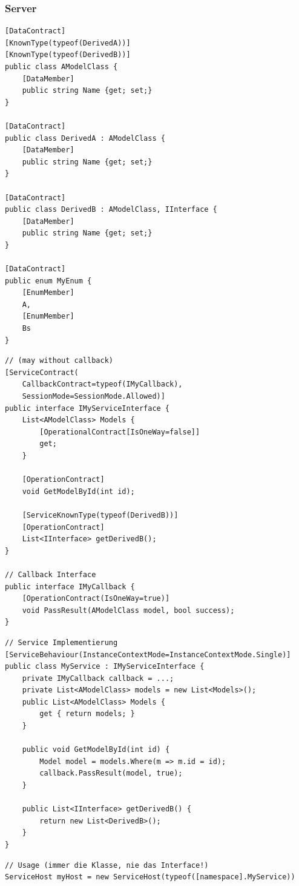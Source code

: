 \subsubsection{Server}
\begin{lstlisting}[caption=Data Transfer Objects (DTO)]
[DataContract]
[KnownType(typeof(DerivedA))]
[KnownType(typeof(DerivedB))]
public class AModelClass {
	[DataMember]
	public string Name {get; set;}	
}

[DataContract]
public class DerivedA : AModelClass {
	[DataMember]
	public string Name {get; set;}
}

[DataContract]
public class DerivedB : AModelClass, IInterface {
	[DataMember]
	public string Name {get; set;}
}

[DataContract]
public enum MyEnum {
	[EnumMember]
	A,
	[EnumMember]
	Bs
}
\end{lstlisting}
\begin{lstlisting}[caption=Service Interface]
// (may without callback)
[ServiceContract(
	CallbackContract=typeof(IMyCallback),
	SessionMode=SessionMode.Allowed)]
public interface IMyServiceInterface {
	List<AModelClass> Models {
		[OperationalContract[IsOneWay=false]]
		get;
	}
	
	[OperationContract]
	void GetModelById(int id);
	
	[ServiceKnownType(typeof(DerivedB))]
	[OperationContract]
	List<IInterface> getDerivedB();
}

// Callback Interface
public interface IMyCallback {
	[OperationContract(IsOneWay=true)]
	void PassResult(AModelClass model, bool success);
}

\end{lstlisting}
\begin{lstlisting}[caption=Service Implementation]
// Service Implementierung
[ServiceBehaviour(InstanceContextMode=InstanceContextMode.Single)]
public class MyService : IMyServiceInterface {
	private IMyCallback callback = ...;
	private List<AModelClass> models = new List<Models>();
	public List<AModelClass> Models {
		get { return models; }
	}
	
	public void GetModelById(int id) {
		Model model = models.Where(m => m.id = id);
		callback.PassResult(model, true);
	}
	
	public List<IInterface> getDerivedB() {
		return new List<DerivedB>();
	}
}

\end{lstlisting}
\begin{lstlisting}
// Usage (immer die Klasse, nie das Interface!)
ServiceHost myHost = new ServiceHost(typeof([namespace].MyService))
\end{lstlisting}

